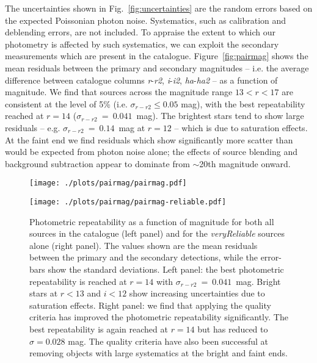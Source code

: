\documentclass[useAMS,usenatbib]{mn2e}
\begin{document}
The uncertainties shown in Fig.~\ref{fig:uncertainties}
are the random errors based on the expected Poissonian photon noise.
Systematics, such as calibration and deblending errors,
are not included.
To appraise the extent to which our photometry is affected
by such systematics, we can exploit the
secondary measurements which are present in the catalogue.
Figure~\ref{fig:pairmag} shows the mean residuals between
the primary and secondary magnitudes
-- i.e. the average difference between catalogue columns \emph{r}-\emph{r2},
\emph{i}-\emph{i2}, \emph{ha}-\emph{ha2} -- as a function of magnitude.
We find that sources across the magnitude range 
$13 < r < 17$ are consistent at the level of 5\%
(i.e. $\sigma_{r-r2} \le 0.05$ mag),
with the best repeatability
reached at $r=14$ ($\sigma_{r-r2}~=~0.041$~mag).
The brightest stars tend to show large residuals
-- e.g. $\sigma_{r-r2}~=~0.14$~mag at $r=12$ --
which is due to saturation effects.
At the faint end we find residuals which
show significantly more scatter than would be expected
from photon noise alone;
the effects of source blending and background subtraction
appear to dominate from $\sim$20th magnitude onward.

\begin{figure*}
\begin{minipage}[b]{0.45\linewidth}
\centering
\texttt{[image: ./plots/pairmag/pairmag.pdf]}
\label{fig:pairmag}
\end{minipage}
\hspace{0.5cm}
\begin{minipage}[b]{0.45\linewidth}
\centering
\texttt{[image: ./plots/pairmag/pairmag-reliable.pdf]}
\label{fig:pairmag_reliable}
\end{minipage}
\caption{Photometric repeatability as a function of magnitude
         for both all sources in the catalogue (left panel)
         and for the \emph{veryReliable} sources alone (right panel).
         The values shown are the mean residuals
         between the primary and the secondary detections,
         while the error-bars show the standard deviations.
         Left panel: 
         the best photometric repeatability is reached at $r=14$
         with $\sigma_{r-r2}~=~0.041$~mag.
         Bright stars at $r<13$ and $i<12$ 
         show increasing uncertainties due to saturation effects.
         Right panel: we find that applying the quality criteria
         has improved the photometric repeatability significantly.
         The best repeatability is again reached at $r=14$
         but has reduced to $\sigma=0.028$ mag.
         The quality criteria have also been successful
         at removing objects with large systematics at the bright
         and faint ends.
    }
\end{figure*}
\end{document}
